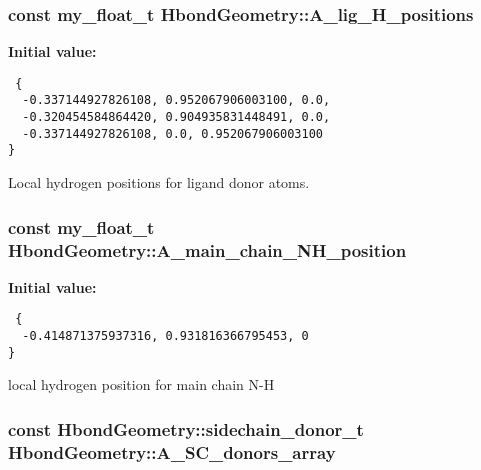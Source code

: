 \subsubsection{\setlength{\rightskip}{0pt plus 5cm}const my\_\-float\_\-t \bf{Hbond\-Geometry::A\_\-lig\_\-H\_\-positions}\hspace{0.3cm}{\tt  [static, private]}}\label{classASCbase_1_1HbondGeometry_7749c80383b11d3353e1ffad00700b52}


\textbf{Initial value:}

\begin{Code}\begin{verbatim} {
  -0.337144927826108, 0.952067906003100, 0.0, 
  -0.320454584864420, 0.904935831448491, 0.0, 
  -0.337144927826108, 0.0, 0.952067906003100  
}
\end{verbatim}\end{Code}
Local hydrogen positions for ligand donor atoms. 

\subsubsection{\setlength{\rightskip}{0pt plus 5cm}const my\_\-float\_\-t \bf{Hbond\-Geometry::A\_\-main\_\-chain\_\-NH\_\-position}\hspace{0.3cm}{\tt  [static, private]}}\label{classASCbase_1_1HbondGeometry_d2a5bf930c8cc804ff282ab0752d26d4}


\textbf{Initial value:}

\begin{Code}\begin{verbatim} {
  -0.414871375937316, 0.931816366795453, 0
}
\end{verbatim}\end{Code}
local hydrogen position for main chain N-H 

\subsubsection{\setlength{\rightskip}{0pt plus 5cm}const \bf{Hbond\-Geometry::sidechain\_\-donor\_\-t} Hbond\-Geometry::A\_\-SC\_\-donors\_\-array\hspace{0.3cm}{\tt  [static, private]}}\label{classASCbase_1_1HbondGeometry_25aa470a8b192c3efde135af8f963f07}



